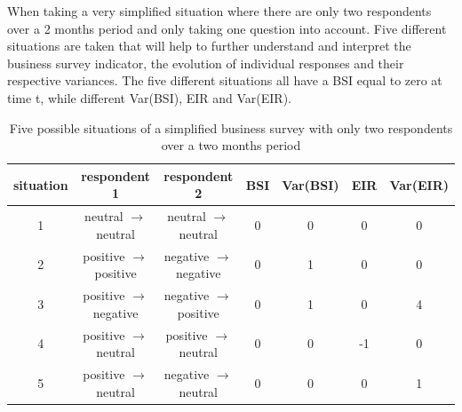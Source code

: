 \documentclass[12pt,a4paper,oneside]{book}
\begin{document}
When taking a very simplified situation where there are only two respondents over a 2 months period and only taking one question into account. 
Five different situations are taken that will help to further understand and interpret the business survey indicator, the evolution of individual responses and their respective variances.
The five different situations all have a BSI equal to zero at time t, while different Var(BSI), EIR and Var(EIR). 


\begin{table}[H]
    \caption{Five possible situations of a simplified business survey with only two respondents over a two months period}
    \label{tab:explanation of Var and BSI}
    \centering
\begin{tabular}{c|c c c c c c} \footnotesize
situation    & respondent 1 & respondent 2           &  BSI & Var(BSI) & EIR & Var(EIR) \\ \hline
 1 & neutral $\rightarrow$ neutral & neutral $\rightarrow$ neutral & 0 & 0 & 0 & 0   \\
 2 & positive $\rightarrow$ positive & negative $\rightarrow$ negative & 0 & 1 & 0 & 0 \\
 3 & positive $\rightarrow$ negative & negative $\rightarrow$ positive & 0 & 1 & 0 & 4 \\
 4 & positive $\rightarrow$ neutral & positive $\rightarrow$ neutral & 0 & 0 & -1 & 0  \\
 5 & positive $\rightarrow$ neutral & negative $\rightarrow$ neutral & 0 & 0 & 0 & 1  \\
\end{tabular}
\end{table}
%
\end{document}
